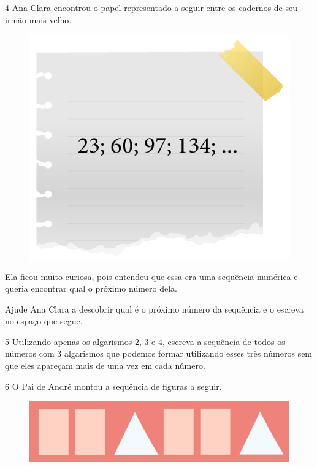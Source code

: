 \pagebreak
\num{4} Ana Clara encontrou o papel representado a seguir entre os cadernos de seu irmão mais velho.

\begin{figure}[htpb!]
\centering
\includegraphics[width=.6\textwidth]{../ilustracoes/MAT5/SAEB_5ANO_MAT_figura27.png}
\end{figure}

Ela ficou muito curiosa, pois entendeu que essa era uma sequência
numérica e queria encontrar qual o próximo número dela.

Ajude Ana Clara a descobrir qual é o próximo número da sequência e o escreva no espaço que segue.


\num{5} Utilizando apenas os algarismos 2, 3 e 4, escreva a sequência de
todos os números com 3 algarismos que podemos formar utilizando esses
três números sem que eles apareçam mais de uma vez em cada número.


\pagebreak
\num{6} O Pai de André montou a sequência de figuras a seguir.

\begin{figure}[htpb!]
\centering
\includegraphics[width=\textwidth]{../ilustracoes/MAT5/SAEB_5ANO_MAT_figura28.png}
\end{figure}


